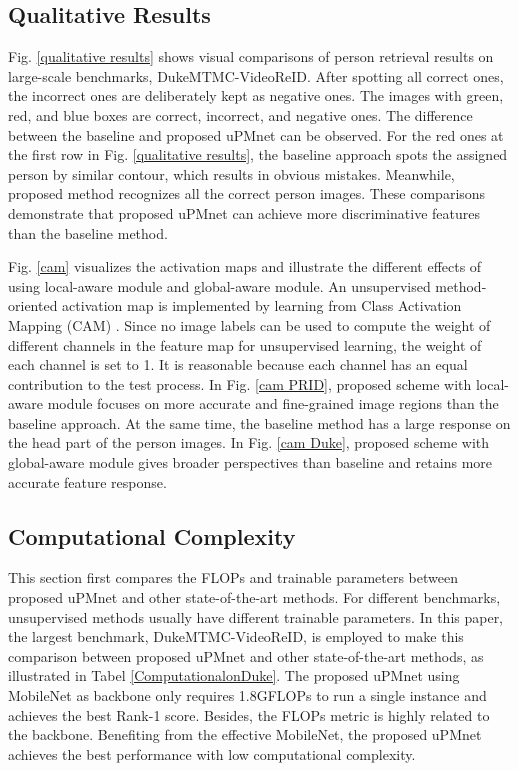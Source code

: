 \documentclass{cta-author}
\begin{document}
	\subsection{Qualitative Results}
	Fig. \ref{qualitative results} shows visual comparisons of person retrieval results on large-scale benchmarks, DukeMTMC-VideoReID. After spotting all correct ones, the incorrect ones are deliberately kept as negative ones. The images with green, red, and blue boxes are correct, incorrect, and negative ones. The difference between the baseline and proposed uPMnet can be observed. For the red ones at the first row in Fig. \ref{qualitative results}, the baseline approach spots the assigned person by similar contour, which results in obvious mistakes. Meanwhile, proposed method recognizes all the correct person images. These comparisons demonstrate that proposed uPMnet can achieve more discriminative features than the baseline method.
	
	Fig. \ref{cam} visualizes the activation maps and illustrate the different effects of using local-aware module and global-aware module. An unsupervised method-oriented activation map is implemented by learning from Class Activation Mapping (CAM) \cite{RN403}. Since no image labels can be used to compute the weight of different channels in the feature map for unsupervised learning, the weight of each channel is set to 1. It is reasonable because each channel has an equal contribution to the test process. In Fig. \ref{cam PRID}, proposed scheme with local-aware module focuses on more accurate and fine-grained image regions than the baseline approach. At the same time, the baseline method has a large response on the head part of the person images. In Fig. \ref{cam Duke}, proposed scheme with global-aware module gives broader perspectives than baseline and retains more accurate feature response.  

	\subsection{Computational Complexity} \label{computationalcomplexity}
	This section first compares the FLOPs and trainable parameters between proposed uPMnet and other state-of-the-art methods. For different benchmarks, unsupervised methods usually have different trainable parameters. In this paper, the largest benchmark, DukeMTMC-VideoReID, is employed to make this comparison between proposed uPMnet and other state-of-the-art methods, as illustrated in Tabel \ref{ComputationalonDuke}. The proposed uPMnet using MobileNet as backbone only requires 1.8GFLOPs to run a single instance and achieves the best Rank-1 score. Besides, the FLOPs metric is highly related to the backbone. Benefiting from the effective MobileNet, the proposed uPMnet achieves the best performance with low computational complexity. 
	
\end{document}
